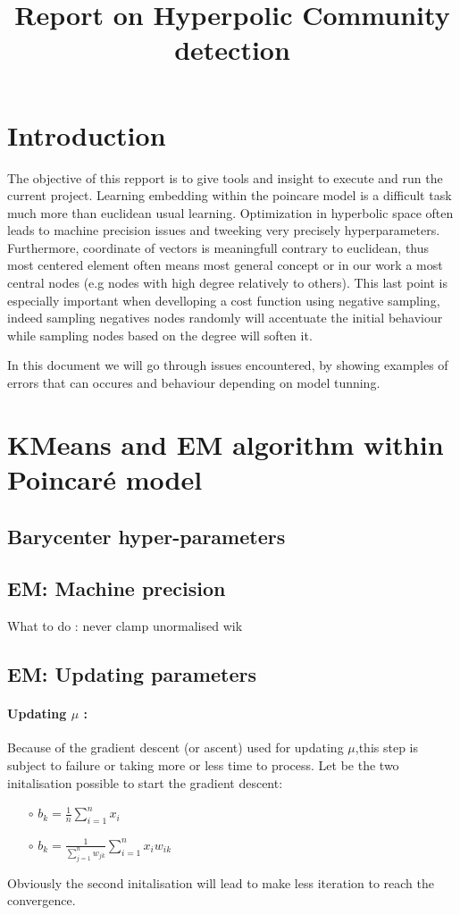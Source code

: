 \documentclass{article}
\title{Report on Hyperpolic Community detection}
\author{}
\begin{document}
    \maketitle
    \section{Introduction}
    The objective of this repport is to give tools and insight to execute and run the current project. Learning embedding within the poincare model is a difficult task much more than euclidean usual learning.
    Optimization in hyperbolic space often leads to machine precision issues and tweeking very precisely hyperparameters.
    Furthermore, coordinate of vectors is meaningfull contrary to euclidean, thus most centered element often means most general concept or in our work a most central nodes (e.g nodes with high degree relatively to others). This last point is especially important when develloping a cost function using negative sampling, indeed sampling negatives nodes randomly will accentuate the initial behaviour while sampling nodes based on the degree will soften it.

    In this document we will go through issues encountered, by showing examples of errors that can occures and behaviour depending on model tunning.


    \section{KMeans and EM algorithm within Poincaré model}
        \subsection{Barycenter hyper-parameters}

        \subsection{EM:  Machine precision}
            What to do : never clamp unormalised wik 

        \subsection{EM: Updating parameters}
            \paragraph{Updating $\mu$ : }
            Because of the gradient descent (or ascent) used for updating $\mu$,this step is subject to failure or taking more or less time to process.
            Let be the two initalisation possible to start the gradient descent: 
            \begin{itemize}
                \item[$\circ$]  $b_k = \frac{1}{n}\sum \limits_{i=1}^n x_i$
                \item[$\circ$]  $b_k = \frac{1}{\sum \limits_{j=1}^n w_{jk}}\sum \limits_{i=1}^n x_iw_{ik}$ 
            \end{itemize}
            Obviously the second initalisation will lead to make less iteration to reach the convergence.
\end{document}
